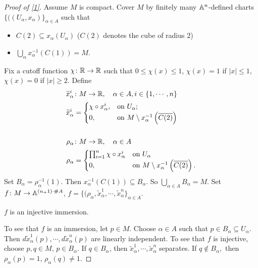 \begin{proof}[Proof of \cref{1}]
    Assume $M$ is compact. Cover $M$ by finitely many $\mathbb{A}^n $-defined charts $\{((U_{\alpha },x_{\alpha })\} _{\alpha \in A}$ such that
    \begin{itemize}
        \item $C(2) \subseteq x_{\alpha }(U_{\alpha })$ ($C(2)$ denotes the cube of radius $2$)
        \item $\bigcup_{\alpha } x_{\alpha }^{-1}(C(1))=M$.
    \end{itemize}
    Fix a cutoff function $\chi \colon \mathbb{R} \to \mathbb{R}$ such that $0 \leq \chi(x)\leq 1$, $\chi(x)=1$ if $|x|\leq 1$, $\chi(x)=0$ if $|x|\geq 2$. Define
    \begin{align*}
        \widetilde x_{\alpha }^i  & \colon M \to \R, \quad \alpha \in A, i \in \{1,\cdots ,n\} \\
        \widetilde x_{\alpha }^i  &=
        \begin{cases}
            \chi \circ x_{\alpha }^i ,&\text{on} \ U_{\alpha };\\
            0,&\text{on} \ M \setminus x_{\alpha }^{-1}\left( \overline{C(2)} \right) 
        \end{cases}\\
                                  &\\
        \rho _{\alpha }& \colon M \to \R, \quad \alpha \in A\\
        \rho _{\alpha }&=
        \begin{cases}
            \prod _{i=1}^n  \chi \circ x^i _{\alpha } &\text{on} \ U_{\alpha }\\
            0,\quad &\text{on} \ M \setminus x_{\alpha }^{-1}\left( \overline{C(2)} \right) .
        \end{cases}
    \end{align*}
    Set $B_{\alpha }=\rho _{\alpha }^{-1}(1)$. Then $x_{\alpha }^{-1}(C(1))\subseteq B_{\alpha }$. So $\bigcup_{\alpha \in A} B_{\alpha }=M$. Set $f \colon M \to \mathbb{A}^{(n_+1)\cdot \# A}$, $f=\{(\rho _{\alpha },\widetilde x_{\alpha }^1,\cdots ,\widetilde x_{\alpha }^n \}_{\alpha \in A} $. 
    \begin{claim}
        $f$ is an injective immersion.
    \end{claim}
    To see that $f$ is an immersion, let $p \in M$. Choose $\alpha \in A$ such that $p \in B_{\alpha }\subseteq U_{\alpha }. $ Then $d \widetilde x_{\alpha }^1(p),\cdots ,d \widetilde x_{\alpha }^n (p)$ are linearly independent. To see that $f$ is injective, choose $p,q \in M$, $p \in B_{\alpha }$. If $q \in B_{\alpha }$, then $\widetilde x_{\alpha }^1,\cdots ,\widetilde x_{\alpha }^n $ separates. If $q \notin B_{\alpha },$ then $\rho _{\alpha }(p)=1$, $\rho _{\alpha }(q)\neq 1$.
\end{proof}

